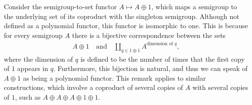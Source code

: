 \begin{remark}
    \label{rem:coproduct-as-polynomial-functor}
    Consider the semigroup-to-set functor $A \mapsto A \oplus 1$, which maps a semigroup to the underlying set of its coproduct with the singleton semigroup. Although not defined as a polynomial functor, this functor is isomorphic to one. This is because for every semigroup $A$ there is a bijective correspondence between the sets
    \begin{align*}%
    A \oplus 1 \quad \text{and} \quad \coprod_{q \in 1 \oplus 1} A^{\text{dimension of $q$}},
    \end{align*}
    where the dimension of $q$ is defined to be the number of times that the first copy of $1$ appears in $q$. Furthermore, this bijection is natural, and thus we can speak of $A \oplus 1$ as being a polynomial functor. This remark applies to similar constructions, which involve a coproduct of several copies of $A$ with several copies of $1$, such as $A \oplus A \oplus A \oplus 1 \oplus 1$.
\end{remark}










